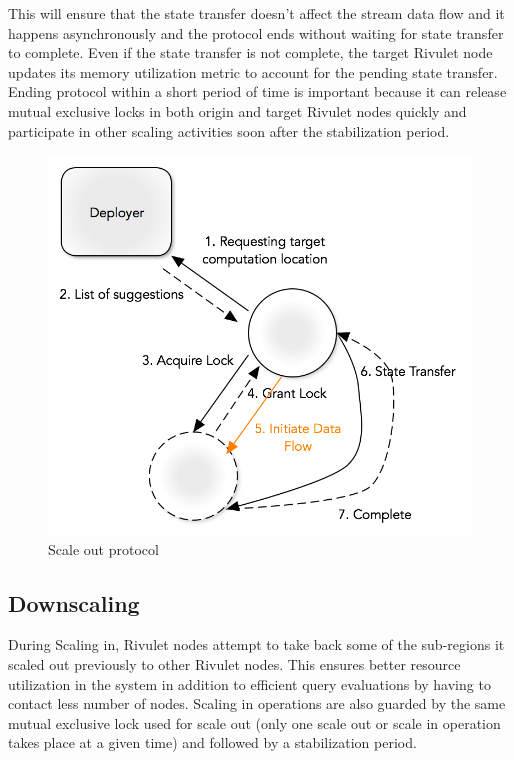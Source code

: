 This will ensure that the state transfer doesn't affect the stream data flow and it happens asynchronously and the protocol ends without waiting for state transfer to complete.
Even if the state transfer is not complete, the target Rivulet node updates its memory utilization metric to account for the pending state transfer. 
Ending protocol within a short period of time is important because it can release mutual exclusive locks in both origin and target Rivulet nodes quickly and participate in other scaling activities soon after the stabilization period.
%
\begin{figure}
    \centerline{\includegraphics[scale=0.55]{figures/scale-out-protocol.png}}
    \caption{Scale out protocol}
    \label{fig:scale-out-protocol}
\end{figure}
%
\subsection{Downscaling}
During Scaling in, Rivulet nodes attempt to take back some of the sub-regions it scaled out previously to other Rivulet nodes.
This ensures better resource utilization in the system in addition to efficient query evaluations by having to contact less number of nodes.
Scaling in operations are also guarded by the same mutual exclusive lock used for scale out (only one scale out or scale in operation takes place at a given time) and followed by a stabilization period.

